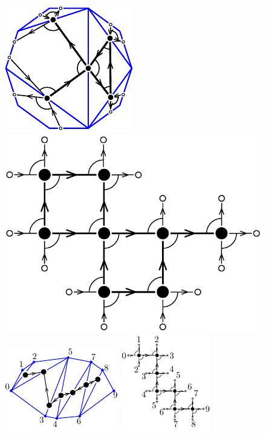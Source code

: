 \documentclass{amsart}
\theoremstyle{definition}
\begin{document}
\begin{figure}[ht]
	\capstart
	\centerline{\includegraphics[scale=.8]{dissectionQuiver} \quad \includegraphics[scale=.35]{gridQuiver} \quad \includegraphics[scale=1.2]{bijectionAssociahedronDissection} \quad \includegraphics[scale=1.2]{bijectionAssociahedronGrid}}
	\caption{}
	\label{fig:dissectionGridQuivers}
\end{figure}
\end{document}
